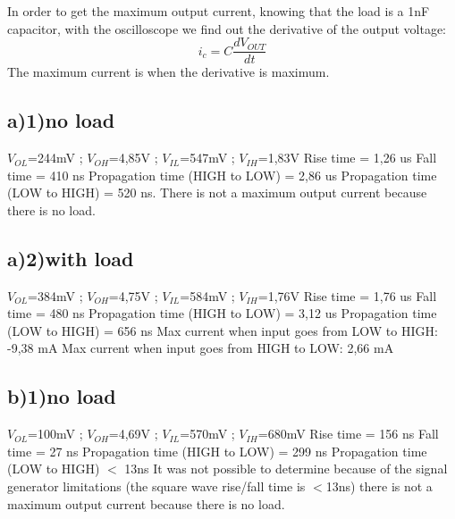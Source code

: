 In order to get the maximum output current, knowing that the
 load is a 1nF capacitor, with the oscilloscope we find out
  the derivative of the output voltage:
\begin{equation}
    i_{c}=C\frac{dV_{OUT}}{dt}
\end{equation}
The maximum current is when the derivative is maximum.
\subsection*{a)1)no load}
$V_{OL}$=244mV ;
$V_{OH}$=4,85V ; 
$V_{IL}$=547mV ;
$V_{IH}$=1,83V
\newline
Rise time = 1,26 us 
\newline
Fall time = 410 ns 
\newline 
Propagation time (HIGH to LOW) = 2,86 us 
\newline
Propagation time (LOW to HIGH) = 520 ns.
\newline
There is not a maximum output current because there is no load.

\subsection*{a)2)with load} 

$V_{OL}$=384mV ; 
$V_{OH}$=4,75V ; 
$V_{IL}$=584mV ;
$V_{IH}$=1,76V 
\newline
Rise time = 1,76 us
\newline
Fall time = 480 ns
\newline
Propagation time (HIGH to LOW) = 3,12 us
\newline
Propagation time (LOW to HIGH) = 656 ns
\newline
Max current when input goes from LOW to HIGH: -9,38 mA
\newline
Max current when input goes from HIGH to LOW: 2,66 mA
\subsection*{b)1)no load}
$V_{OL}$=100mV ; 
$V_{OH}$=4,69V ; 
$V_{IL}$=570mV ; 
$V_{IH}$=680mV 
\newline
Rise time = 156 ns
\newline
Fall time = 27 ns
\newline
Propagation time (HIGH to LOW) = 299 ns
\newline
Propagation time (LOW to HIGH) $<$ 13ns
\newline
It was not possible to determine because of the signal generator limitations
(the square wave rise/fall time is $<$13ns)
there is not a maximum output current because there is no load. 

